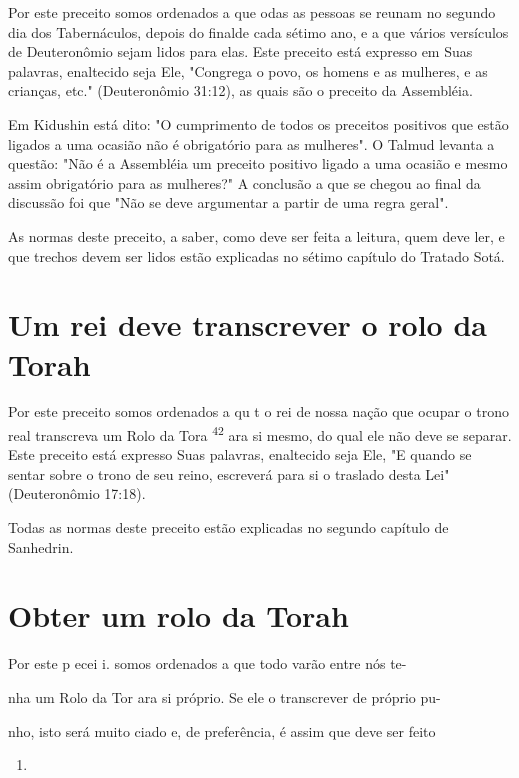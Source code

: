 \begin{itemize}
\begin{enumrate}
\begin{itemize}
\begin{itemize}
Por este preceito somos ordenados a que odas as pessoas se reu­nam no
segundo dia dos Tabernáculos, depois do finalde cada sétimo ano, e a que
vários versículos de Deuteronômio sejam lidos para elas. Este preceito
está expresso em Suas palavras, enaltecido seja Ele, "Congrega o povo,
os ho­mens e as mulheres, e as crianças, etc." (Deuteronômio 31:12), as
quais são o preceito da Assembléia.

Em Kidushin está dito: "O cumprimento de todos os preceitos posi­tivos
que estão ligados a uma ocasião não é obrigatório para as mulheres". O
Talmud levanta a questão: "Não é a Assembléia um preceito positivo
ligado a uma ocasião e mesmo assim obrigatório para as mulheres?" A
conclusão a que se chegou ao final da discussão foi que "Não se deve
argumentar a partir de uma regra geral".

As normas deste preceito, a saber, como deve ser feita a leitura, quem
deve ler, e que trechos devem ser lidos estão explicadas no sétimo
capítulo do Tratado Sotá.

\section{Um rei deve transcrever o rolo da Torah}

Por este preceito somos ordenados a qu t o rei de nossa nação que ocupar
o trono real transcreva um Rolo da Tora \textsuperscript{42} ara si
mesmo, do qual ele não deve se separar. Este preceito está expresso Suas
palavras, enalteci­do seja Ele, "E quando se sentar sobre o trono de seu
reino, escreverá para si o traslado desta Lei" (Deuteronômio 17:18).

Todas as normas deste preceito estão explicadas no segundo capítu­lo de
Sanhedrin.

\section{Obter um rolo da Torah}



Por este p ecei i. somos ordenados a que todo varão entre nós te-


nha um Rolo da Tor ara si próprio. Se ele o transcrever de próprio pu-

nho, isto será muito ciado e, de preferência, é assim que deve ser feito


\begin{enumerate}
\def\labelenumi{\arabic{enumi}.}
\setcounter{enumi}{38}
\item
 

\end{enumerate}
\end{itemize}
\end{itemize}
\end{enumrate}
\end{itemize}
